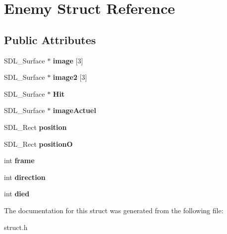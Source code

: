 \hypertarget{structEnemy}{}\section{Enemy Struct Reference}
\label{structEnemy}
\subsection*{Public Attributes}
\begin{DoxyCompactItemize}
\item 
\mbox{\label{structEnemy_afc1cf868e4b6602d2166ee9cfbf1d06e}} 
S\+D\+L\+\_\+\+Surface $\ast$ {\bfseries image} \mbox{[}3\mbox{]}
\item 
\mbox{\label{structEnemy_a43bdca7bc81657fccdb7d8cb7369f673}} 
S\+D\+L\+\_\+\+Surface $\ast$ {\bfseries image2} \mbox{[}3\mbox{]}
\item 
\mbox{\label{structEnemy_a62ed00c1aa4ac7bb90cb132c6c56b21d}} 
S\+D\+L\+\_\+\+Surface $\ast$ {\bfseries Hit}
\item 
\mbox{\label{structEnemy_ab8d7f9eceeef8f17331210f3f1fd2cf3}} 
S\+D\+L\+\_\+\+Surface $\ast$ {\bfseries image\+Actuel}
\item 
\mbox{\label{structEnemy_ac364f2ddf130c8622889deca0b6ba4d0}} 
S\+D\+L\+\_\+\+Rect {\bfseries position}
\item 
\mbox{\label{structEnemy_ab2e55fdee92a7689185599a67f726b41}} 
S\+D\+L\+\_\+\+Rect {\bfseries positionO}
\item 
\mbox{\label{structEnemy_a554574b1537da808a14f909b8a701735}} 
int {\bfseries frame}
\item 
\mbox{\label{structEnemy_a1de1605c4b41f74c3b0f4023258323ab}} 
int {\bfseries direction}
\item 
\mbox{\label{structEnemy_a59e822a6f71ebe5f7773bb96030c397c}} 
int {\bfseries died}
\end{DoxyCompactItemize}


The documentation for this struct was generated from the following file\+:\begin{DoxyCompactItemize}
\item 
struct.\+h\end{DoxyCompactItemize}
